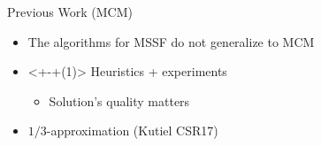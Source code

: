 \begin{frame}{Previous Work (MCM)}
\begin{itemize}[<+>]
	\item The algorithms for MSSF do not generalize to MCM  
	\item<+-+(1)> Heuristics + experiments
  		\begin{itemize}[<+>]
  			\item Solution's quality \alert{matters}
		\end{itemize}
	\item $1/3$-approximation (Kutiel CSR17) 
\end{itemize}
\end{frame}